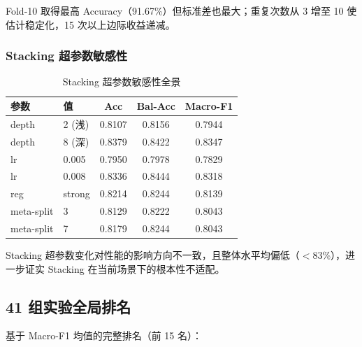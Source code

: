Fold-10 取得最高 Accuracy（91.67\%）但标准差也最大；重复次数从 3 增至 10 使估计稳定化，15 次以上边际收益递减。

\subsubsection{Stacking 超参数敏感性}

\begin{table}[htbp]
\centering
\small
\caption{Stacking 超参数敏感性全景}
\label{tab:stacking_hyperparams}
\begin{tabular}{|ll|ccc|}
\hline
\textbf{参数} & \textbf{值} & \textbf{Acc} & \textbf{Bal-Acc} & \textbf{Macro-F1} \\
\hline
depth & 2 (浅) & 0.8107 & 0.8156 & 0.7944 \\
depth & 8 (深) & 0.8379 & 0.8422 & 0.8347 \\
lr & 0.005 & 0.7950 & 0.7978 & 0.7829 \\
lr & 0.008 & 0.8336 & 0.8444 & 0.8318 \\
reg & strong & 0.8214 & 0.8244 & 0.8139 \\
meta-split & 3 & 0.8129 & 0.8222 & 0.8043 \\
meta-split & 7 & 0.8179 & 0.8244 & 0.8043 \\
\hline
\end{tabular}
\end{table}

Stacking 超参数变化对性能的影响方向不一致，且整体水平均偏低（$<$83\%），进一步证实 Stacking 在当前场景下的根本性不适配。

\subsection{41 组实验全局排名}

基于 Macro-F1 均值的完整排名（前 15 名）：

